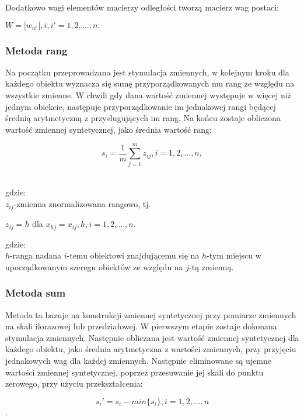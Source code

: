 \documentclass[12pt,a4paper]{report}
\begin{document}
Dodatkowo wagi elementów macierzy odległości tworzą macierz wag postaci:

\begin{center}
$W=\lbrack{w_{ii'}\rbrack}, i,i'=1, 2, ..., n.$
\end{center}


\subsubsection{Metoda rang}
\noindent


Na początku przeprowadzana jest stymulacja zmiennych, w kolejnym kroku dla każdego obiektu wyznacza się sumę przyporządkowanych mu rang ze względu na wszystkie zmienne. W chwili gdy dana wartość zmiennej występuje w więcej niż jednym obiekcie, następuje przyporządkowanie im jednakowej rangi będącej średnią arytmetyczną z przysługujących im rang. Na końcu zostaje obliczona wartość zmiennej syntetycznej, jako średnia wartość rang:\\
\begin{center}
$$s_{i}=\frac{1}{m}\sum_{j=1}^{m} z_{ij}, i=1, 2, ..., n,$$\\
\end{center}
gdzie:\\
$z_{ij}$-zmienna znormalizowana rangowo, tj.
\begin{center}
$z_{ij}=h$ dla $x_{hj}=x_{ij}, h,i=1, 2, ..., n.$
\end{center}
gdzie:\\
$h$-ranga nadana $i$-temu obiektowi znajdującemu się na $h$-tym miejscu w uporządkowanym szeregu obiektów ze względu na $j$-tą zmienną.

\subsubsection{Metoda sum}
\noindent


Metoda ta bazuje na konstrukcji zmiennej syntetycznej przy pomiarze zmiennych na skali ilorazowej lub przedziałowej. W pierwszym etapie zostaje dokonana stymulacja zmiennych. Następnie obliczana jest wartość zmiennej syntetycznej dla każdego obiektu, jako średnia arytmetyczna z wartości zmiennych, przy przyjęciu jednakowych wag dla każdej zmiennych. Następnie eliminowane są ujemne wartości zmiennej syntetycznej, poprzez przesuwanie jej skali do punktu zerowego, przy użyciu przekształcenia:
\begin{center}
$$s_{i}'=s_{i}-min\{s_i\}, i=1, 2, ..., n$$.\\
\end{center}
\end{document}
